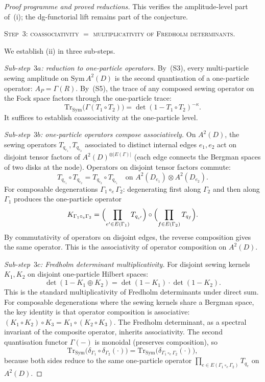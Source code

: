 \documentclass[11pt]{article}
\begin{document}
\begin{proof}[Proof programme and proved reductions]
This verifies the amplitude-level part of~(i); the dg-functorial
lift remains part of the conjecture.

\medskip
\noindent\textsc{Step~$3$: coassociativity $=$
multiplicativity of Fredholm determinants.}

We establish (ii) in three sub-steps.

\emph{Sub-step~$3a$: reduction to one-particle operators.}
By~(S3), every multi-particle sewing amplitude on
$\mathrm{Sym}\, A^2(D)$ is the second quantisation of a
one-particle operator: $A_P = \Gamma(R)$.  By~(S5), the
trace of any composed sewing operator on the Fock space
factors through the one-particle trace:
\[
  \mathrm{Tr}_{\mathrm{Sym}}\bigl(
  \Gamma(T_1 \circ T_2)\bigr)
  = \det(1 - T_1 \circ T_2)^{-\kappa}.
\]
It suffices to establish coassociativity at the one-particle
level.

\emph{Sub-step~$3b$: one-particle operators compose
associatively.}
On $A^2(D)$, the sewing operators $T_{q_{e_1}}, T_{q_{e_2}}$
associated to distinct internal edges $e_1, e_2$ act on
disjoint tensor factors of
$A^2(D)^{\otimes |E(\Gamma)|}$ (each edge connects the Bergman
spaces of two disks at the node).  Operators on disjoint tensor
factors commute:
\[
  T_{q_{e_1}} \circ T_{q_{e_2}} = T_{q_{e_2}} \circ T_{q_{e_1}}
  \quad \text{on } A^2(D_{e_1}) \otimes A^2(D_{e_2}).
\]
For composable degenerations $\Gamma_1 \circ_e \Gamma_2$:
degenerating first along $\Gamma_2$ and then along $\Gamma_1$
produces the one-particle operator
\[
  K_{\Gamma_1 \circ_e \Gamma_2}
  = \Bigl(\prod_{e' \in E(\Gamma_1)} T_{q_{e'}}\Bigr)
  \circ
  \Bigl(\prod_{f \in E(\Gamma_2)} T_{q_f}\Bigr).
\]
By commutativity of operators on disjoint edges, the
reverse composition gives the same operator.  This is the
associativity of operator composition on $A^2(D)$.

\emph{Sub-step~$3c$: Fredholm determinant
multiplicativity.}
For disjoint sewing kernels $K_1, K_2$ on disjoint
one-particle Hilbert spaces:
\begin{equation}\label{eq:ct2-fredholm-mult}
  \det(1 - K_1 \oplus K_2)
  = \det(1 - K_1) \cdot \det(1 - K_2).
\end{equation}
This is the standard multiplicativity of Fredholm determinants
under direct sum.  For composable degenerations where the
sewing kernels share a Bergman space, the key identity is
that operator composition is associative:
$(K_1 \circ K_2) \circ K_3 = K_1 \circ (K_2 \circ K_3)$.
The Fredholm determinant, as a spectral invariant of the
composite operator, inherits associativity.  The second
quantisation functor $\Gamma(-)$ is monoidal (preserves
composition), so
\[
  \mathrm{Tr}_{\mathrm{Sym}}\bigl(
  \delta_{\Gamma_1} \circ \delta_{\Gamma_2}(\cdot)\bigr)
  = \mathrm{Tr}_{\mathrm{Sym}}\bigl(
  \delta_{\Gamma_1 \circ_e \Gamma_2}(\cdot)\bigr),
\]
because both sides reduce to the same one-particle operator
$\prod_{e \in E(\Gamma_1 \circ_e \Gamma_2)} T_{q_e}$ on
$A^2(D)$.


\end{proof}
\end{document}
